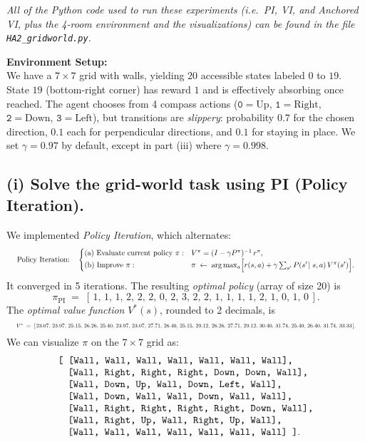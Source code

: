 \emph{All of the Python code used to run these experiments (i.e.\ PI, VI, and Anchored VI, 
plus the 4-room environment and the visualizations) can be found in the file 
\texttt{HA2\_gridworld.py}.}

\bigskip

\noindent
\textbf{Environment Setup:}\\
We have a \(7\times7\) grid with walls, yielding 20 accessible states labeled
\(0\) to \(19\). State \(19\) (bottom-right corner) has reward \(1\) and 
is effectively absorbing once reached. The agent chooses from 4 compass actions 
(\(\mathtt{0}=\text{Up}\), \(\mathtt{1}=\text{Right}\), 
\(\mathtt{2}=\text{Down}\), \(\mathtt{3}=\text{Left}\)), but transitions are 
\emph{slippery}: probability \(0.7\) for the chosen direction, \(0.1\) each 
for perpendicular directions, and \(0.1\) for staying in place. 
We set \(\gamma=0.97\) by default, except in part (iii) where \(\gamma=0.998\).

\subsection*{(i) Solve the grid-world task using PI (Policy Iteration).}

\noindent
We implemented \emph{Policy Iteration}, which alternates:
\[
  \resizebox{\textwidth}{!}{
  $\text{Policy Iteration:}\quad
  \begin{cases}
    \text{(a) Evaluate current policy }\pi: 
      & V^\pi = (I - \gamma P^\pi)^{-1} \, r^\pi,\\
    \text{(b) Improve } \pi: & 
      \pi \;\gets\; \arg\max_{a} 
        \Bigl[r(s,a) + \gamma\sum_{s'}P(s'\!\mid s,a)\,V^\pi(s')\Bigr].
  \end{cases}$
  }
\]
It converged in 5 iterations. The resulting \emph{optimal policy} (array of size 20) is
\[
  \pi_{\mathrm{PI}} \;=\; 
  [\,1,\,1,\,1,\,2,\,2,\,2,\,0,\,2,\,3,\,2,\,2,\,1,\,1,\,1,\,1,\,2,\,1,\,0,\,1,\,0\,].
\]
The \emph{optimal value function} \(V^*(s)\), rounded to 2 decimals, is
\[
  \resizebox{\textwidth}{!}{
  $V^* \;=\;
  [\,23.07,\,23.97,\,25.15,\,26.26,\,25.40,\,23.97,\,23.07,\,27.71,\,26.40,\,25.15,\,
    29.12,\,26.26,\,27.71,\,29.12,\,30.40,\,31.74,\,25.40,\,26.40,\,31.74,\,33.33\,].$
  }
\]
We can visualize \(\pi\) on the \(7\times7\) grid as:
\[
\begin{array}{l}
\text{\ttfamily
[ [Wall,  Wall,  Wall,  Wall,  Wall,  Wall,  Wall],}\\
\quad \text{\ttfamily [Wall, Right, Right, Right, Down, Down, Wall],}\\
\quad \text{\ttfamily [Wall, Down,  Up,   Wall,  Down, Left,  Wall],}\\
\quad \text{\ttfamily [Wall, Down,  Wall, Wall,  Down, Wall,  Wall],}\\
\quad \text{\ttfamily [Wall, Right, Right, Right, Right, Down, Wall],}\\
\quad \text{\ttfamily [Wall, Right, Up,    Wall, Right, Up,   Wall],}\\
\quad \text{\ttfamily [Wall, Wall,  Wall,  Wall, Wall,  Wall,  Wall] ]}.
\end{array}
\]

